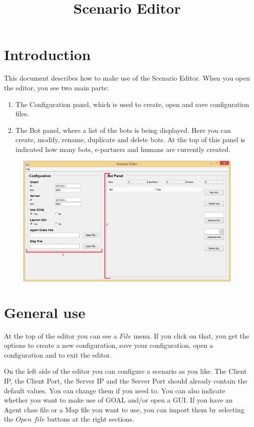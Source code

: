 \documentclass[a4paper]{article}
\title{Scenario Editor}
\date{}
\begin{document}
\maketitle
\newpage

\tableofcontents
\newpage

\section{Introduction}
This document describes how to make use of the Scenario Editor. When you open the editor, you see two main parts:
\begin{enumerate}
\item The Configuration panel, which is used to create, open and save configuration files.
\item The Bot panel, where a list of the bots is being displayed. Here you can create, modify, rename, duplicate and delete bots. At the top of this panel is indicated how many bots, e-partners and humans are currently created.
\end{enumerate}

\begin{figure}
\includegraphics{editor.png}
\end{figure}

\section{General use}
At the top of the editor you can see a $File$ menu. If you click on that, you get the options to create a new configuration, save your configuration, open a configuration and to exit the editor.

On the left side of the editor you can configure a scenario as you like. The Client IP, the Client Port, the Server IP and the Server Port should already contain the default values. You can change them if you need to. You can also indicate whether you want to make use of GOAL and/or open a GUI. If you have an Agent class file or a Map file you want to use, you can import them by selecting the $Open$ $file$ buttons at the right sections.
\end{document}
